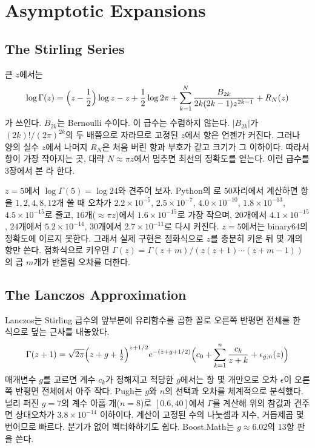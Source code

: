 \section{Asymptotic Expansions}
\label{sec:stirling}

\subsection{The Stirling Series}

큰 $z$에서는 
\begin{equation}
\label{eq:stirling}
\log\Gamma(z)=\Bigl(z-\frac12\Bigr)\log z-z+\frac12\log2\pi+\sum_{k=1}^{N}\frac{B_{2k}}{2k(2k-1)z^{2k-1}}+R_N(z)
\end{equation}
가 쓰인다. $B_{2k}$는 Bernoulli 수이다. 이 급수는 수렴하지 않는다. $|B_{2k}|$가 $(2k)!/(2\pi)^{2k}$의 두 배쯤으로 자라므로 고정된 $z$에서 항은 언젠가 커진다. 그러나 양의 실수 $z$에서 나머지 $R_N$은 처음 버린 항과 부호가 같고 크기가 그 이하이다\cite{olver1974asymptotics}. 따라서 항이 가장 작아지는 곳, 대략 $N\approx\pi z$에서 멈추면 최선의 정확도를 얻는다. 이런 급수를 3장에서 본 라 한다.

$z=5$에서 $\log\Gamma(5)=\log24$와 견주어 보자. Python의 로 $50$자리에서 계산하면 항을 $1,2,4,8,12$개 쓸 때 오차가 $2.2\times10^{-5}$, $2.5\times10^{-7}$, $4.0\times10^{-10}$, $1.8\times10^{-13}$, $4.5\times10^{-15}$로 줄고, $16$개($\approx\pi z$)에서 $1.6\times10^{-15}$로 가장 작으며, $20$개에서 $4.1\times10^{-15}$, $24$개에서 $5.2\times10^{-14}$, $30$개에서 $2.7\times10^{-11}$로 다시 커진다. $z=5$에서는 binary64의 정확도에 이르지 못한다. 그래서 실제 구현은 점화식으로 $z$를 충분히 키운 뒤 몇 개의 항만 쓴다. 점화식으로 키우면 $\Gamma(z)=\Gamma(z+m)/(z(z+1)\cdots(z+m-1))$의 곱 $m$개가 반올림 오차를 더한다.

\subsection{The Lanczos Approximation}

Lanczos는 Stirling 급수의 앞부분에 유리함수를 곱한 꼴로 오른쪽 반평면 전체를 한 식으로 덮는 근사를 내놓았다\cite{lanczos1964}.
\[
\Gamma(z+1)=\sqrt{2\pi}\Bigl(z+g+\tfrac12\Bigr)^{z+1/2}e^{-(z+g+1/2)}\Bigl(c_0+\sum_{k=1}^{n}\frac{c_k}{z+k}+\epsilon_{g,n}(z)\Bigr)
\]
매개변수 $g$를 고르면 계수 $c_k$가 정해지고 적당한 $g$에서는 항 몇 개만으로 오차 $\epsilon$이 오른쪽 반평면 전체에서 아주 작다. Pugh는 $g$와 $n$의 선택과 오차를 체계적으로 분석했다\cite{pugh2004}. 널리 퍼진 $g=7$의 계수 아홉 개($n=8$)로 $[0.6,40]$에서 $\Gamma$를 계산해 위의  참값과 견주면 상대오차가 $3.8\times10^{-14}$ 이하이다. 계산이 고정된 수의 나눗셈과 지수, 거듭제곱 몇 번이므로 빠르다. 분기가 없어 벡터화하기도 쉽다. Boost.Math는 $g\approx6.02$의 $13$항 판을 쓴다\cite{boostmath}.

